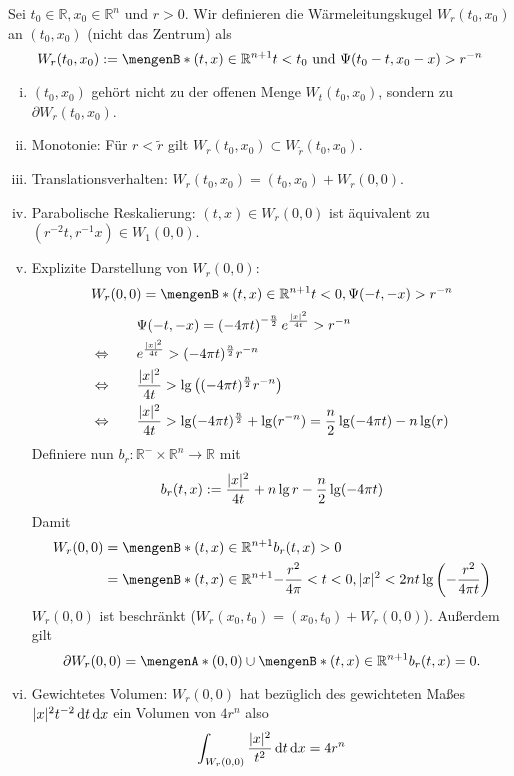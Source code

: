 \begin{definition}[Wärmeleitungskugel]
	Sei $t_0 \in \mathbb{R}, x_0 \in \mathbb{R}^n$ und $r >0$. Wir definieren die Wärmeleitungskugel $W_r(t_0,x_0)$ an $(t_0,x_0)$ (nicht das Zentrum) als
	\[
		W_r(t_0,x_0) := \set[(t,x) \in \mathbb{R}^{n+1}]{ t<t_0 \text{ und } \Psi(t_0-t, x_0-x)> r^{-n}}
	\]
\end{definition}
\begin{bemerkung}
	\begin{enumerate}[(i)]
		\item $(t_0,x_0)$ gehört nicht zu der offenen Menge $W_t(t_0,x_0)$, sondern zu \\ $\partial W_r(t_0,x_0)$.
		\item Monotonie: Für $r < \tilde r$ gilt $ W_r(t_0,x_0) \subset W_{\tilde r}(t_0,x_0)$.
		\item Translationsverhalten: $W_r(t_0,x_0) = (t_0,x_0)+ W_r(0,0)$.
		\item Parabolische Reskalierung: $(t,x) \in W_r(0,0)$ ist äquivalent zu $( r^{-2}t, r^{-1}x) \in W_1(0,0)$.
		\item Explizite Darstellung von $W_r(0,0)$:
		\[
			W_r(0,0) = \set[(t,x) \in \mathbb{R}^{n+1}]{t<0, \Psi(-t,-x)> r^{-n}}
		\] 
		\begin{align*}
			& \qquad \Psi(-t,-x) = \left( -4 \pi t \right)^{- \frac{n}{2}} e^{\frac{\lvert x\rvert^2}{4t}} > r^{-n} \\
			\Leftrightarrow & \qquad e^{\frac{\lvert x\rvert^2}{4t}} > (-4 \pi t)^{\frac{n}{2}} r^{-n}\\
			\Leftrightarrow & \qquad \frac{\lvert x\rvert^2}{4t} > \lg \left( (-4 \pi t)^{\frac{n}{2}} r^{-n} \right) \\
			\Leftrightarrow & \qquad \frac{\lvert x\rvert^2}{4t} > \lg (-4 \pi t)^{\frac{n}{2}} + \lg (r^{-n}) = \frac{n}{2} \lg (-4 \pi t)- n \lg ( r)
		\end{align*}
		Definiere nun $b_r: \mathbb{R}^- \times \mathbb{R}^n \to \mathbb{R}$ mit
		\[
			b_r(t,x):= \frac{\lvert x\rvert^2}{4t} + n \lg r - \frac{n}{2} \lg(-4 \pi t)
		\]
		Damit
		\begin{align*}
			W_r(0,0) &= \set[(t,x) \in \mathbb{R}^{n+1}]{b_r(t,x)>0} \\
			&= \set[(t,x) \in \mathbb{R}^{n+1}]{- \frac{r^2}{4 \pi} < t < 0 , \abs{x}^2 < 2nt \lg \left( - \frac{r^2}{4 \pi t} \right)}
		\end{align*}
		$W_r(0,0)$ ist beschränkt ($W_r(x_0,t_0)= (x_0,t_0)+ W_r(0,0)$). Außerdem gilt
		\[
			\partial W_r(0,0) = \set{(0,0)} \cup \set[(t,x) \in \mathbb{R}^{n+1}]{b_r(t,x)=0}.
		\]
		\item Gewichtetes Volumen: $W_r(0,0)$ hat bezüglich des gewichteten Maßes $\lvert x\rvert^2 t^{-2} \, \mathrm{d}t \, \mathrm{d}x$ ein Volumen von $4 r^n$ also
		\[
			\int_{W_r(0,0)}^{} \frac{\lvert x\rvert^2}{t^2} \,\mathrm{d}t \, \mathrm{d}x = 4 r^n
		\]
	\end{enumerate}
\end{bemerkung}

